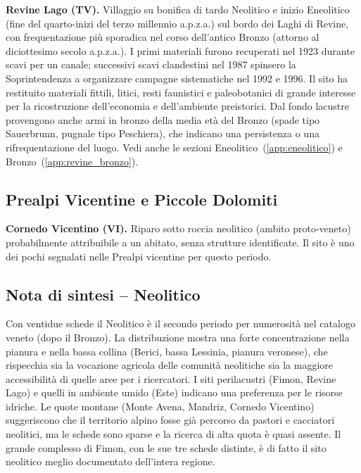 \textbf{Revine Lago (TV).} \label{app:revine} Villaggio su bonifica di tardo Neolitico e inizio Eneolitico (fine del quarto-inizi del terzo millennio a.p.z.a.) sul bordo dei Laghi di Revine, con frequentazione più sporadica nel corso dell'antico Bronzo (attorno al diciottesimo secolo a.p.z.a.). I primi materiali furono recuperati nel 1923 durante scavi per un canale; successivi scavi clandestini nel 1987 spinsero la Soprintendenza a organizzare campagne sistematiche nel 1992 e 1996. Il sito ha restituito materiali fittili, litici, resti faunistici e paleobotanici di grande interesse per la ricostruzione dell'economia e dell'ambiente preistorici. Dal fondo lacustre provengono anche armi in bronzo della media età del Bronzo (spade tipo Sauerbrunn, pugnale tipo Peschiera), che indicano una persistenza o una rifrequentazione del luogo. Vedi anche le sezioni Eneolitico~(\ref{app:eneolitico}) e Bronzo~(\ref{app:revine_bronzo}).

\subsection{Prealpi Vicentine e Piccole Dolomiti}

\textbf{Cornedo Vicentino (VI).} Riparo sotto roccia neolitico (ambito proto-veneto) probabilmente attribuibile a un abitato, senza strutture identificate. Il sito è uno dei pochi segnalati nelle Prealpi vicentine per questo periodo.

\subsection*{Nota di sintesi -- Neolitico}

Con ventidue schede il Neolitico è il secondo periodo per numerosità nel catalogo veneto (dopo il Bronzo). La distribuzione mostra una forte concentrazione nella pianura e nella bassa collina (Berici, bassa Lessinia, pianura veronese), che rispecchia sia la vocazione agricola delle comunità neolitiche sia la maggiore accessibilità di quelle aree per i ricercatori. I siti perilacustri (Fimon, Revine Lago) e quelli in ambiente umido (Este) indicano una preferenza per le risorse idriche. Le quote montane (Monte Avena, Mandriz, Cornedo Vicentino) suggeriscono che il territorio alpino fosse già percorso da pastori e cacciatori neolitici, ma le schede sono sparse e la ricerca di alta quota è quasi assente. Il grande complesso di Fimon, con le sue tre schede distinte, è di fatto il sito neolitico meglio documentato dell'intera regione.

